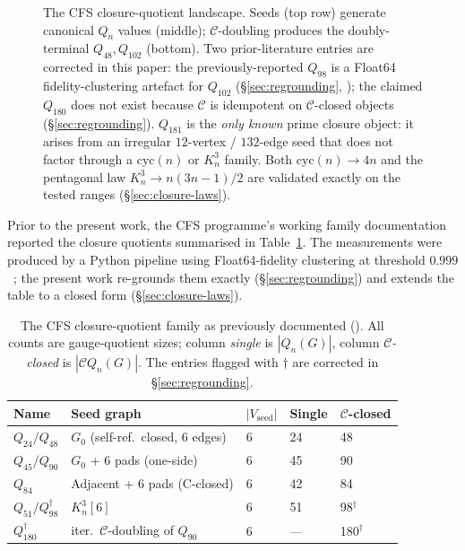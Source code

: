 \documentclass[12pt,a4paper]{article}
\theoremstyle{definition}
\theoremstyle{remark}
\newcommand{\Kn}{K_n^3}
\newcommand{\Qn}{Q_n}
\newcommand{\Ccls}{\mathcal{C}}             %
\newcommand{\cyc}{\mathrm{cyc}}
\begin{document}
\begin{figure}[H]
\caption{The CFS closure-quotient landscape. Seeds (top row) generate
canonical $\Qn$ values (middle); $\Ccls$-doubling produces the
doubly-terminal $Q_{48}, Q_{102}$ (bottom). Two prior-literature
entries are corrected in this paper: the previously-reported $Q_{98}$
is a Float64 fidelity-clustering artefact for $Q_{102}$
(\S\ref{sec:regrounding}, \cite{closure-v5-audit-fidelity}); the
claimed $Q_{180}$ does not exist because $\Ccls$ is idempotent on
$\Ccls$-closed objects (\S\ref{sec:regrounding}). $Q_{181}$ is the
\emph{only known} prime closure object: it arises from an irregular
$12$-vertex / $132$-edge seed that does not factor through a
$\cyc(n)$ or $\Kn$ family. Both $\cyc(n) \to 4n$ and the pentagonal
law $\Kn \to n(3n{-}1)/2$ are validated exactly on the tested ranges
(\S\ref{sec:closure-laws}).}
\label{fig:q-family-tree}
\end{figure}

Prior to the present work, the CFS programme's working family
documentation reported the closure quotients summarised in
Table~\ref{tab:family-prior}. The measurements were produced by a
Python pipeline using Float64-fidelity clustering at threshold
$0.999$~\cite{CFSpipeline2026}; the present work re-grounds them
exactly (\S\ref{sec:regrounding}) and extends the table to a closed
form (\S\ref{sec:closure-laws}).

\begin{table}[H]\small
\centering
\caption{The CFS closure-quotient family as previously documented
(\cite{CFSpipeline2026, CFS2026}). All counts are gauge-quotient
sizes; column \emph{single} is $|\Qn(G)|$, column \emph{$\Ccls$-closed}
is $|\Ccls\Qn(G)|$. The entries flagged with $\dagger$ are corrected
in \S\ref{sec:regrounding}.}\label{tab:family-prior}
\begin{tabular}{@{}lllll@{}}
\toprule
Name & Seed graph & $|V_{\text{seed}}|$ & Single & $\Ccls$-closed \\
\midrule
$Q_{24} / Q_{48}$ & $G_0$ (self-ref.~closed, 6 edges) & 6 & 24 & 48 \\
$Q_{45} / Q_{90}$ & $G_0$ + 6 pads (one-side) & 6 & 45 & 90 \\
$Q_{84}$          & Adjacent + 6 pads (C-closed) & 6 & 42 & 84 \\
$Q_{51} / Q_{98}^{\dagger}$ & $\Kn[6]$ & 6 & 51 & 98$^\dagger$ \\
$Q_{180}^{\dagger}$ & iter.~$\Ccls$-doubling of $Q_{90}$ & 6 & --- & 180$^\dagger$ \\
\bottomrule
\end{tabular}
\end{table}
\end{document}
